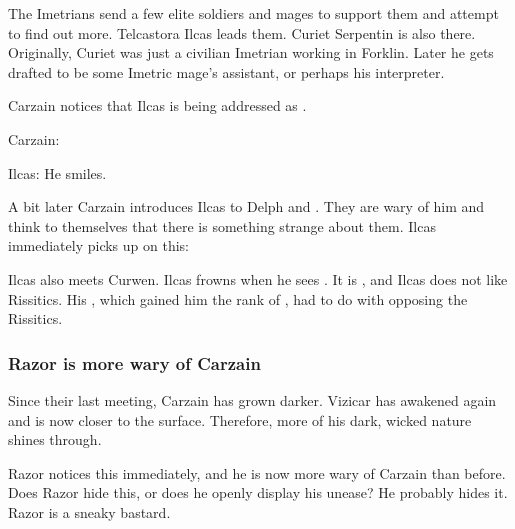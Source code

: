 \begin{garbage}
The Imetrians send a few elite soldiers and mages to support them and attempt to find out more. Telcastora Ilcas leads them. 
Curiet Serpentin is also there. Originally, Curiet was just a civilian Imetrian working in Forklin. 
Later he gets drafted to be some Imetric mage's assistant, or perhaps his interpreter. 

Carzain notices that Ilcas is being addressed as . 

\begin{prose}
  Carzain: 
  
  Ilcas: 
  He smiles. 
\end{prose}

A bit later Carzain introduces Ilcas to Delph and \Tsekkect. 
They are wary of him and think to themselves that there is something strange about them. 
Ilcas immediately picks up on this: 
\begin{prose}
\end{prose}

Ilcas also meets Curwen. 
Ilcas frowns when he sees . 
It is , and Ilcas does not like Rissitics. 
His , which gained him the rank of \Retaxis, had to do with opposing the Rissitics. 





\subsubsection{Razor is more wary of Carzain}
Since their last meeting, Carzain has grown darker. 
Vizicar has awakened again and is now closer to the surface. 
Therefore, more of his dark, wicked \sathariah{} nature shines through. 

Razor notices this immediately, and he is now more wary of Carzain than before. 
Does Razor hide this, or does he openly display his unease? 
He probably hides it. 
Razor is a sneaky bastard. 






\end{garbage}
